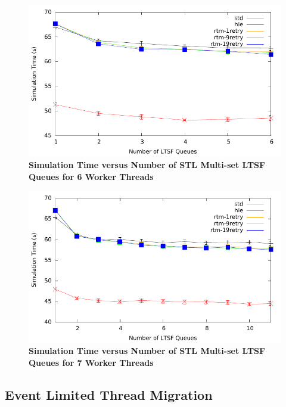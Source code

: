 \documentclass[11pt]{book}
\begin{document}
\begin{figure}[H]
    \centering
    \graphicspath{ {./figures/} }
    \includegraphics[width=\textwidth,height=\textheight,keepaspectratio]{contThrMig-hugeEpidemicSim-timeVSschedQs-multiset-6thread}
    \caption{\textbf{Simulation Time versus Number of STL Multi-set LTSF Queues
    for 6 Worker Threads}}
    \label{fig:contThrMig_timeVSschq_6threads}
\end{figure}

\begin{figure}[H]
    \centering
    \graphicspath{ {./figures/} }
    \includegraphics[width=\textwidth,height=\textheight,keepaspectratio]{contThrMig-hugeEpidemicSim-timeVSschedQs-multiset-7thread}
    \caption{\textbf{Simulation Time versus Number of STL Multi-set LTSF Queues
    for 7 Worker Threads}}
    \label{fig:contThrMig_timeVSschq_7threads}
\end{figure}

\subsection{Event Limited Thread Migration}
\end{document}
